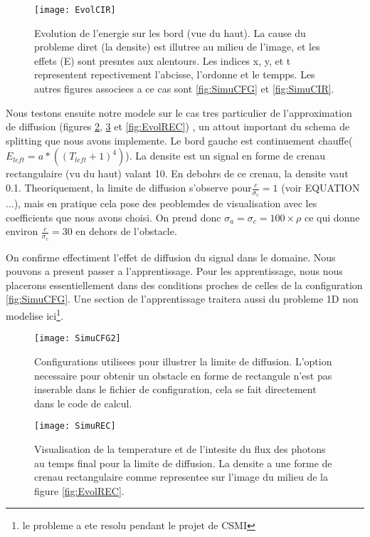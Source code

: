 \begin{figure}[H]
\centering
\texttt{[image: EvolCIR]} 
\decoRule
\caption[EvolCIR]{Evolution de l'energie sur les bord (vue du haut). La cause du probleme diret (la densite) est illutree au milieu de l'image, et les effets (E) sont presntes aux alentours. Les indices x, y, et t representent repectivement l'abcisse, l'ordonne et le tempps. Les autres figures associees a ce cas sont \ref{fig:SimuCFG} et \ref{fig:SimuCIR}.  }
\label{fig:EvolCIR}
\end{figure}

Nous testons ensuite notre modele sur le cas tres particulier de l'approximation de diffusion (figures \ref{fig:SimuCFG2}, \ref{fig:SimuREC} et \ref{fig:EvolREC}) , un attout important du schema de splitting que nous avons implemente. Le bord gauche est continuement chauffe($E_{left} = a*((T_{left}+1)^4)$). La densite est un signal en forme de crenau rectangulaire (vu du haut) valant 10. En debohrs de ce crenau, la densite vaut 0.1. Theoriquement, la limite de diffusion s'observe pour$\frac{c}{\sigma_c} = 1$ (voir EQUATION ...), mais en pratique cela pose des peoblemdes de visualisation avec les coefficients que nous avons choisi. On prend donc $\sigma_a = \sigma_c = 100 \times \rho$ ce qui donne environ $\frac{c}{\sigma_c} = 30$ en dehors de l'obstacle.

On confirme effectiment l'effet de diffusion du signal dans le domaine. Nous pouvons a present passer a l'apprentissage. Pour les apprentissage, nous nous placerons essentiellement dans des conditions proches de celles de la configuration \ref{fig:SimuCFG}. Une section de l'apprentissage traitera aussi du probleme 1D non modelise ici\footnote{le probleme a ete resolu pendant le projet de CSMI}. 

\begin{figure}[!h]
\centering
\texttt{[image: SimuCFG2]} 
\decoRule
\caption[SimuCFG2]{Configurations utilisees pour illustrer la limite de diffusion. L'option necessaire pour obtenir un obstacle en forme de rectangule n'est pas inserable dans le fichier de configuration, cela se fait directement dans le code de calcul.}
\label{fig:SimuCFG2}
\end{figure}


\begin{figure}[!h]
\centering
\texttt{[image: SimuREC]} 
\decoRule
\caption[SimuREC]{Visualisation de la temperature et de l'intesite du flux des photons au temps final pour la limite de diffusion. La densite a une forme de crenau rectangulaire comme representee sur l'image du milieu de la figure \ref{fig:EvolREC}.}
\label{fig:SimuREC}
\end{figure}


